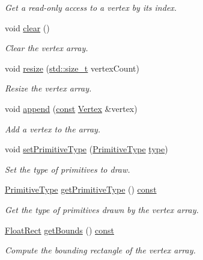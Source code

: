 \begin{DoxyCompactItemize}
\begin{DoxyCompactList}\small\item\em Get a read-\/only access to a vertex by its index. \end{DoxyCompactList}\item 
void \hyperlink{classsf_1_1_vertex_array_a3654c424aca1f9e468f369bc777c839c}{clear} ()
\begin{DoxyCompactList}\small\item\em Clear the vertex array. \end{DoxyCompactList}\item 
void \hyperlink{classsf_1_1_vertex_array_a0c0fe239e8f9a54e64d3bbc96bf548c0}{resize} (\hyperlink{nc__alloc_8h_a7b60c5629e55e8ec87a4547dd4abced4}{std\-::size\-\_\-t} vertex\-Count)
\begin{DoxyCompactList}\small\item\em Resize the vertex array. \end{DoxyCompactList}\item 
void \hyperlink{classsf_1_1_vertex_array_a80c8f6865e53bd21fc6cb10fffa10035}{append} (\hyperlink{term__entry_8h_a57bd63ce7f9a353488880e3de6692d5a}{const} \hyperlink{classsf_1_1_vertex}{Vertex} \&vertex)
\begin{DoxyCompactList}\small\item\em Add a vertex to the array. \end{DoxyCompactList}\item 
void \hyperlink{classsf_1_1_vertex_array_aa38c10707c28a97f4627ae8b2f3ad969}{set\-Primitive\-Type} (\hyperlink{group__graphics_ga5ee56ac1339984909610713096283b1b}{Primitive\-Type} \hyperlink{_entity_8cpp_aa209819775142a76b8e49319d79ecab2}{type})
\begin{DoxyCompactList}\small\item\em Set the type of primitives to draw. \end{DoxyCompactList}\item 
\hyperlink{group__graphics_ga5ee56ac1339984909610713096283b1b}{Primitive\-Type} \hyperlink{classsf_1_1_vertex_array_af2205f76fe98fb3cf1f303f25d43c045}{get\-Primitive\-Type} () \hyperlink{term__entry_8h_a57bd63ce7f9a353488880e3de6692d5a}{const} 
\begin{DoxyCompactList}\small\item\em Get the type of primitives drawn by the vertex array. \end{DoxyCompactList}\item 
\hyperlink{namespacesf_ab0d978f5903922a6bdfca1736b71ccc9}{Float\-Rect} \hyperlink{classsf_1_1_vertex_array_a741d1b1acbb175289eab37bbf49cbb24}{get\-Bounds} () \hyperlink{term__entry_8h_a57bd63ce7f9a353488880e3de6692d5a}{const} 
\begin{DoxyCompactList}\small\item\em Compute the bounding rectangle of the vertex array. \end{DoxyCompactList}\end{DoxyCompactItemize}
